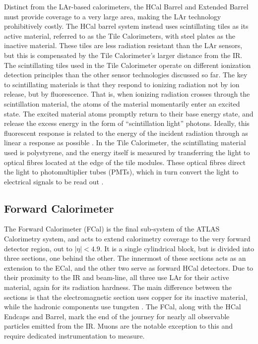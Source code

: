         Distinct from the LAr-based calorimeters, the HCal Barrel and Extended Barrel must provide coverage to a very large area, making the LAr technology prohibitively costly.
        The HCal barrel system instead uses scintillating tiles as its active material,
            referred to as the Tile Calorimeters, with steel plates as the inactive material.
        These tiles are less radiation resistant than the LAr sensors, but this is compensated by the Tile Calorimeter's larger distance from the IR.
        The scintillating tiles used in the Tile Calorimeter operate on different ionization detection principles than the other sensor technologies discussed so far.
        The key to scintillating materials is that they respond to ionizing radiation not by ion release, but by fluorescence.
        That is, when ionizing radiation crosses through the scintillation material, the atoms of the material momentarily enter an excited state.
        The excited material atoms promptly return to their base energy state, and release the excess energy in the form of ``scintillation light'' photons.
        Ideally, this fluorescent response is related to the energy of the incident radiation through as linear a response as possible \cite{wiley_radiation_detection}.
        In the Tile Calorimeter, the scintillating material used is polystyrene, and the energy itself is measured by transferring the light to optical fibres located at the edge of the tile modules.
        These optical fibres direct the light to photomultiplier tubes (PMTs), which in turn convert the light to electrical signals to be read out \cite{tcal_tdr}.

    \subsection{Forward Calorimeter}

        The Forward Calorimeter (FCal) is the final sub-system of the ATLAS Calorimetry system, and acts to extend calorimetry coverage to the very forward detector region, out to $|\eta| < 4.9$.
        It is a single cylindrical block, but is divided into three sections, one behind the other.
        The innermost of these sections acts as an extension to the ECal, and the other two serve as forward HCal detectors.
        Due to their proximity to the IR and beam-line, all three use LAr for their active material, again for its radiation hardness.
        The main difference between the sections is that the electromagnetic section uses copper for its inactive material, while the hadronic components use tungsten \cite{Lar_cal_tdr}.
        The FCal, along with the HCal Endcaps and Barrel, mark the end of the journey for nearly all observable particles emitted from the IR.
        Muons are the notable exception to this and require dedicated instrumentation to measure.

